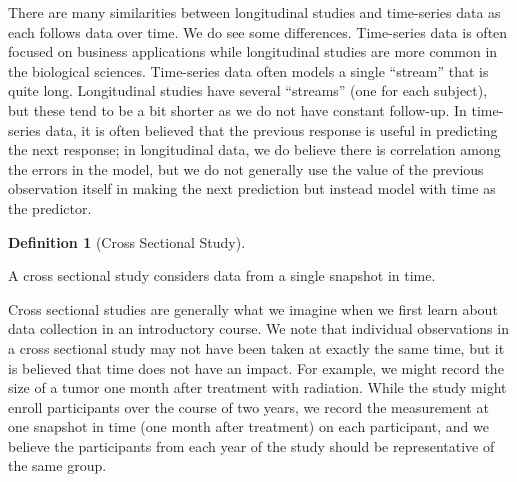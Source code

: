 \documentclass[
  letterpaper,
  DIV=11,
  numbers=noendperiod]{scrreprt}
\theoremstyle{definition}
\newtheorem{definition}{Definition}[chapter]
\theoremstyle{definition}
\theoremstyle{remark}
\begin{document}
\begin{tcolorbox}[enhanced jigsaw, left=2mm, toprule=.15mm, arc=.35mm, breakable, opacitybacktitle=0.6, opacityback=0, rightrule=.15mm, colbacktitle=quarto-callout-note-color!10!white, coltitle=black, leftrule=.75mm, toptitle=1mm, colframe=quarto-callout-note-color-frame, titlerule=0mm, title=\textcolor{quarto-callout-note-color}{\faInfo}\hspace{0.5em}{Note}, bottomrule=.15mm, colback=white, bottomtitle=1mm]

There are many similarities between longitudinal studies and time-series
data as each follows data over time. We do see some differences.
Time-series data is often focused on business applications while
longitudinal studies are more common in the biological sciences.
Time-series data often models a single ``stream'' that is quite long.
Longitudinal studies have several ``streams'' (one for each subject),
but these tend to be a bit shorter as we do not have constant follow-up.
In time-series data, it is often believed that the previous response is
useful in predicting the next response; in longitudinal data, we do
believe there is correlation among the errors in the model, but we do
not generally use the value of the previous observation itself in making
the next prediction but instead model with time as the predictor.

\end{tcolorbox}

\begin{definition}[Cross Sectional
Study]\protect\hypertarget{def-cross-sectional-study}{}\label{def-cross-sectional-study}

A cross sectional study considers data from a single snapshot in time.

\end{definition}

Cross sectional studies are generally what we imagine when we first
learn about data collection in an introductory course. We note that
individual observations in a cross sectional study may not have been
taken at exactly the same time, but it is believed that time does not
have an impact. For example, we might record the size of a tumor one
month after treatment with radiation. While the study might enroll
participants over the course of two years, we record the measurement at
one snapshot in time (one month after treatment) on each participant,
and we believe the participants from each year of the study should be
representative of the same group.
\end{document}
